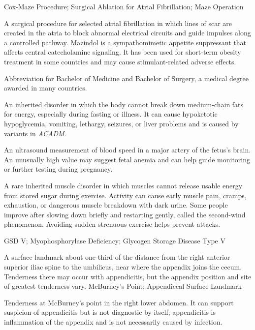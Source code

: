 \synonyms
Cox-Maze Procedure; Surgical Ablation for Atrial Fibrillation; Maze Operation

 A surgical procedure for selected atrial fibrillation in which lines of scar are created in the atria to block abnormal electrical circuits and guide impulses along a controlled pathway.
 Mazindol is a sympathomimetic appetite suppressant that affects central catecholamine signaling. It has been used for short-term obesity treatment in some countries and may cause stimulant-related adverse effects.

 Abbreviation for Bachelor of Medicine and Bachelor of Surgery, a medical degree awarded in many countries.

 An inherited disorder in which the body cannot break down medium-chain fats for energy, especially during fasting or illness. It can cause hypoketotic hypoglycemia, vomiting, lethargy, seizures, or liver problems and is caused by variants in \textit{ACADM}.

 An ultrasound measurement of blood speed in a major artery of the fetus's brain. An unusually high value may suggest fetal anemia and can help guide monitoring or further testing during pregnancy.

 A rare inherited muscle disorder in which muscles cannot release usable energy from stored sugar during exercise. Activity can cause early muscle pain, cramps, exhaustion, or dangerous muscle breakdown with dark urine. Some people improve after slowing down briefly and restarting gently, called the second-wind phenomenon. Avoiding sudden strenuous exercise helps prevent attacks.

\synonyms
GSD V; Myophosphorylase Deficiency; Glycogen Storage Disease Type V

 A surface landmark about one-third of the distance from the right anterior superior iliac spine to the umbilicus, near where the appendix joins the cecum. Tenderness there may occur with appendicitis, but the appendix position and site of greatest tenderness vary.
\synonyms
McBurney's Point; Appendiceal Surface Landmark

 Tenderness at McBurney's point in the right lower abdomen. It can support suspicion of appendicitis but is not diagnostic by itself; appendicitis is inflammation of the appendix and is not necessarily caused by infection.

